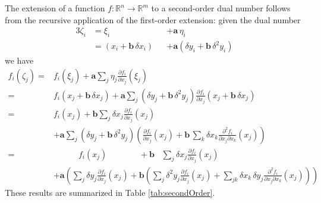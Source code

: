The extension of a function $f: \mathbb{R}^{n} \rightarrow \mathbb{R}^{m}$ to
a second-order dual number follows from the recursive application of the
first-order extension: given the dual number
%
\begin{alignat*}{3}
\zeta_{i} 
&=
\xi_{i} 
&&+ \mathbf{a} \, \eta_{i}
\\
&=
\left( x_{i} + \mathbf{b} \, \delta x_{i} \right)
&&+ \mathbf{a} \left( \delta y_{i} + \mathbf{b} \, \delta^{2} y_{i} \right)
\end{alignat*}
%
we have
%
\begin{align*}
f_{i} \! \left( \zeta_{j} \right)
=&
f_{i} \! \left( \xi_{j} \right) 
+ \mathbf{a} \sum_{j} \eta_{j} \frac{ \partial f_{i} }{ \partial x_{j} } \! \left( \xi_{j} \right) 
\\
=&
f_{i} \! \left( x_{j} + \mathbf{b} \, \delta x_{j} \right) 
+ \mathbf{a} \sum_{j} \left( \delta y_{j} + \mathbf{b} \, \delta^{2} y_{j} \right)
\frac{ \partial f_{i} }{ \partial x_{j} } 
\! \left( x_{j} + \mathbf{b} \, \delta x_{j} \right) 
\\
=&
f_{i} \! \left( x_{j} \right) 
+ \mathbf{b} \sum_{j} \delta x_{j}  \frac{ \partial f_{i} }{ \partial x_{j} } \! \left( x_{j} \right)
\\
&+ 
\mathbf{a} \sum_{j} \left( \delta y_{j} + \mathbf{b} \, \delta^{2} y_{j} \right)
\left( \frac{ \partial f_{i} }{ \partial x_{j} } \! \left( x_{j} \right) + 
\mathbf{b} \, \sum_{k} \delta x_{k} 
\frac{ \partial^{2} f_{i} }{ \partial x_{j} \partial x_{k} } \! \left( x_{j} \right) \right) 
\\
=&
\quad\quad\quad 
f_{i} \! \left( x_{j} \right) 
\quad\quad\quad\;\;\;
+ \mathbf{b} \;\;\;
\sum_{j} \delta x_{j}  \frac{ \partial f_{i} }{ \partial x_{j} } \! \left( x_{j} \right)
\\
&+ 
\mathbf{a} \left( 
\sum_{j} \delta y_{j} \frac{ \partial f_{i} }{ \partial x_{j} } \! \left( x_{j} \right) 
+ \mathbf{b} \left(
\sum_{j} \delta^{2} y_{j} \frac{ \partial f_{i} }{ \partial x_{j} } \! \left( x_{j} \right)
+ \sum_{jk} \delta x_{k} \, \delta y_{j}
\frac{ \partial^{2} f_{i} }{ \partial x_{j} \partial x_{k} } \! \left( x_{j} \right)
\right)
\right)
\end{align*}
%
These results are summarized in Table \ref{tab:secondOrder}.

